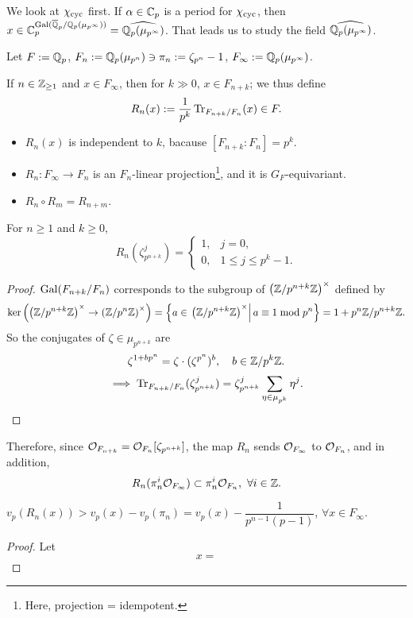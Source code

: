 We look at $\chi_{\mathrm{cyc}}$ first.
If $\alpha\in\mathbb{C}_p$ is a period for $\chi_{\mathrm{cyc}}$,
then $x\in \mathbb{C}_p^{\operatorname{Gal}(\overline{\mathbb{Q}}_p/\mathbb{Q}_p(\mu_{p^\infty}))} = \widehat{\mathbb{Q}_p(\mu_{p^\infty})}$.
That leads us to study the field $\widehat{\mathbb{Q}_p(\mu_{p^\infty})}$.

Let $F := \mathbb{Q}_p$,
$F_n := \mathbb{Q}_p(\mu_{p^n})\ni \pi_n := \zeta_{p^n} - 1$,
$F_\infty := \mathbb{Q}_p(\mu_{p^\infty})$.

If $n\in\mathbb{Z}_{\ge 1}$ and $x\in F_\infty$, then for $k\gg 0$,
$x\in F_{n+k}$;
we thus define \[R_n(x) := \frac{1}{p^k }\operatorname{Tr}_{F_{n+k}/F_n}(x)\in F.\]
\begin{itemize}
\item $R_n(x)$ is independent to $k$, bacause $[F_{n+k} : F_n] = p^k$.
\item $R_n : F_\infty\to F_n$ is an $F_n$-linear projection\footnote{Here, projection = idempotent.}, and it is $G_F$-equivariant.
\item $R_n\circ R_m = R_{n + m}$.
\end{itemize}

\begin{lemma}
    For $n\ge 1$ and $k\ge 0$,
    \[R_n(\zeta_{p^{n+k}}^j) = \begin{cases}
        1, & j  = 0,\\ 0, &1\le j\le p^{k}-1.
    \end{cases}\]
\end{lemma}
\begin{proof}
    $\operatorname{Gal}(F_{n+k}/F_n)$ corresponds to the subgroup of $\left( \mathbb{Z}/p^{n+k}\mathbb{Z} \right)^\times$ defined by \[\ker\left( \left( \mathbb{Z}/p^{n+k}\mathbb{Z} \right)^\times\to \left( \mathbb{Z}/p^{n}\mathbb{Z} \right)^\times \right)
    = \left\{a\in \left.\left( \mathbb{Z}/p^{n+k}\mathbb{Z} \right)^\times\right|a\equiv 1\bmod p^n \right\} = 1 + p^n\mathbb{Z}/p^{n+k}\mathbb{Z}.\]
    So the conjugates of $\zeta\in\mu_{p^{n+k}}$ are
    \[\zeta^{1 + bp^n} = \zeta\cdot(\zeta^{p^n})^b, \quad b\in \mathbb{Z}/p^{k}\mathbb{Z}.\]
\[\implies \operatorname{Tr}_{F_{n+k}/F_n}(\zeta_{p^{n+k}}^j) = \zeta_{p^{n+k}}^j\sum_{\eta\in\mu_{p^k}}\eta^j.
\qedhere
\]
\end{proof}
Therefore, since $\mathcal{O}_{F_{n+k}} = \mathcal{O}_{F_n}[\zeta_{p^{n+k}}]$, the map $R_n$ sends $\mathcal{O}_{F_\infty}$ to $\mathcal{O}_{F_n}$,
and in addition, \[R_n(\pi_n^i\mathcal{O}_{F_\infty}) \subset \pi_n^i\mathcal{O}_{F_n},\ \forall i\in\mathbb{Z}.\]
\begin{corollary}
    $v_p(R_n(x)) > v_p(x) - v_p(\pi_n) =v_p(x) - \dfrac{1}{p^{n-1}(p-1)}$, $\forall x\in F_\infty$.
\end{corollary}
\begin{proof}
Let \[x = \]
\end{proof}

